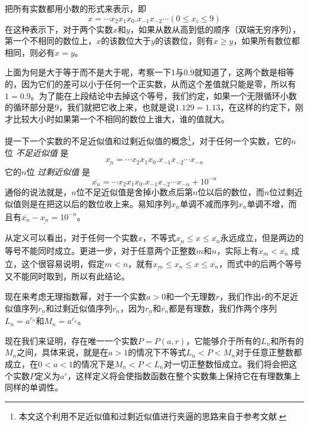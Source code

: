 把所有实数都用小数的形式来表示，即
\begin{equation}
  \label{eq:decimal-expression-of-real}
x=\cdots x_2x_1x_0.x_{-1}x_{-2}\cdots(0 \leqslant x_i \leqslant 9)
\end{equation}
在这种表示下，对于两个实数$x$和$y$，如果从数从高到低的顺序（双端无穷序列），第一个不相同的数位上，$x$的该数位大于$y$的该数位，则有$x \geqslant y$，如果所有数位都相同，则必有$x=y$。

上面为何是大于等于而不是大于呢，考察一下1与$0.\dot{9}$就知道了，这两个数是相等的，因为它们的差可以小于任何一个正实数，从而这个差值就只能是零，所以有$1=0.\dot{9}$。为了能在上段结论中去掉这个等号，我们约定，如果一个无限循环小数的循环部分是9，我们就把它收上来，也就是说$1.12\dot{9}=1.13$，在这样的约定下，刚才比较大小时如果第一个不相同的数位上谁大，谁的值就大。

提一下一个实数的不足近似值和过剩近似值的概念\footnote{本文这个利用不足近似值和过剩近似值进行夹逼的思路来自于参考文献\cite{math-analysis}.}，对于任何一个实数，它的$n$位 \emph{不足近似值} 是
\begin{equation}
  \label{eq:lower-approximate-value-nth}
\underline{x_n}=\cdots x_2x_1x_0.x_{-1}x_{-2}\cdots x_{-n}
\end{equation}
它的$n$位 \emph{过剩近似值} 是
\begin{equation}
  \label{eq:upper-approximate-value-nth}
\overline{x_n}=\cdots x_2x_1x_0.x_{-1}x_{-2}\cdots x_{-n} + 10^{-n}
\end{equation}
通俗的说法就是，$n$位不足近似值是舍掉小数点后第$n$位以后的数位，而$n$位过剩近似值则是在把这以后的数位收上来。易知序列$\underline{x_n}$单调不减而序列$\overline{x_n}$单调不增，而且有$\overline{x_n}-\underline{x_n}=10^{-n}$。

从定义可以看出，对于任何一个实数$x$，不等式$\underline{x_n} \leqslant x \leqslant \overline{x_n}$永远成立，但是两边的等号不能同时成立。更进一步，对于任意两个正整数$m$和$n$，实际上有$\underline{x_m} < \overline{x_n}$ 成立，这个很容易说明，假定$m<n$，就有$\underline{x_m} \leqslant \underline{x_n} \leqslant x \leqslant \overline{x_n}$，而式中的后两个等号又不能同时取到，所以有此结论。

现在来考虑无理指数幂，对于一个实数$a>0$和一个无理数$r$，我们作出$r$的不足近似值序列$\underline{r_n}$和过剩近似值序列$\overline{r_n}$，因为$\underline{r_n}$和$\overline{r_n}$都是有理数，我们作两个序列$L_n=a^{\underline{r_n}}$和$M_n=a^{\overline{r_n}}$。

现在我们来证明，存在唯一一个实数$P=P(a,r)$，它能够介于所有的$L_n$和所有的$M_n$之间，具体来说，就是在$a>1$的情况下不等式$L_n<P<M_n$对于任意正整数都成立，在$0<a<1$的情况下是$M_n<P<L_n$对一切正整数恒成立。我们将会把这个实数$P$定义为$a^r$，这样定义将会使指数函数在整个实数集上保持它在有理数集上同样的单调性。

